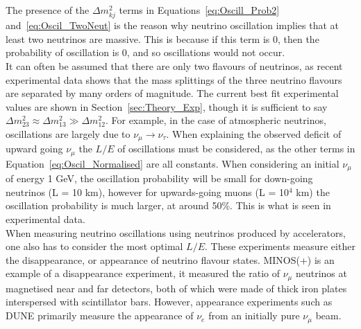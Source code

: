 The presence of the $\Delta m^{2}_{kj}$ terms in Equations~\ref{eq:Oscill_Prob2} and~\ref{eq:Oscil_TwoNeut} is the reason why neutrino oscillation implies that at least two neutrinos are massive. This is because if this term is 0, then the probability of oscillation is 0, and so oscillations would not occur. \\

It can often be assumed that there are only two flavours of neutrinos, as recent experimental data shows that the mass splittings of the three neutrino flavours are separated by many orders of magnitude. The current best fit experimental values are shown in Section~\ref{sec:Theory_Exp}, though it is sufficient to say $\Delta m^{2}_{23} \approx \Delta m^{2}_{13} \gg \Delta m^{2}_{12}$. For example, in the case of atmospheric neutrinos, oscillations are largely due to $\nu_{\mu}\rightarrow\nu_{\tau}$. When explaining the observed deficit of upward going $\nu_{\mu}$ the $L/E$ of oscillations must be considered, as the other terms in Equation~\ref{eq:Oscil_Normalised} are all constants. When considering an initial $\nu_{\mu}$ of energy 1 GeV, the oscillation probability will be small for down-going neutrinos (L = 10 km), however for upwards-going muons (L = 10$^4$ km) the oscillation probability is much larger, at around 50\%. This is what is seen in experimental data. \\

When measuring neutrino oscillations using neutrinos produced by accelerators, one also has to consider the most optimal $L/E$. These experiments measure either the disappearance, or appearance of neutrino flavour states. MINOS(+)\citep{Tzanankos:2011zz} is an example of a disappearance experiment, it measured the ratio of $\nu_{\mu}$ neutrinos at magnetised near and far detectors, both of which were made of thick iron plates interspersed with scintillator bars. However, appearance experiments such as DUNE primarily measure the appearance of $\nu_{e}$ from an initially pure $\nu_{\mu}$ beam. \\

